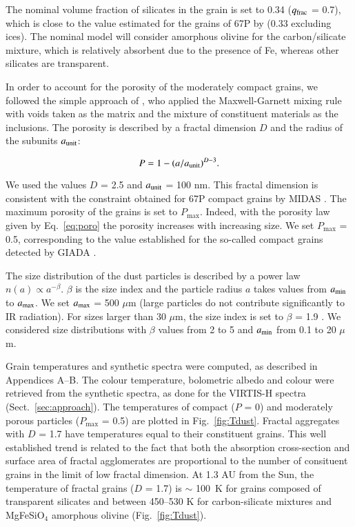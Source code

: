 \documentclass[a4paper,fleqn,usenatbib]{mnras}
\begin{document}
The nominal volume fraction of silicates in the grain is set to 0.34 ($q_{\rm frac}$ = 0.7), which is close to the value estimated for the grains of 67P by \citet{Fulle2016} (0.33 excluding ices).  The nominal model will consider amorphous olivine for the carbon/silicate mixture, which is relatively absorbent due to the presence of Fe, whereas other silicates are transparent.


In order to account for the porosity of the moderately compact grains, we followed the simple approach of \citet{Greenberg1990}, who applied the Maxwell-Garnett mixing rule with voids taken as the matrix and the mixture of constituent materials as the inclusions.  The porosity is described by a fractal dimension $D$ and the radius of the subunits $a_{\rm unit}$:

\begin{equation}\label{eq:poro}
P =1-(a/a_{\rm unit})^{D-3}.
\end{equation}

\noindent
We used the values $D$ = 2.5 and $a_{\rm unit}$ = 100 nm. This fractal dimension is consistent with the constraint obtained for 67P compact grains by MIDAS \citep{Mannel2016}. The maximum porosity of the grains is set to $P_{\max}$. Indeed, with the porosity law given by Eq.~\ref{eq:poro} the porosity increases with increasing size.  We set $P_{\max}$ = 0.5, corresponding to the value established for the so-called compact grains detected by GIADA \citep{Fulle2016}.


The size distribution of the dust particles is described by a power law  $n(a) \propto  a^{-\beta}$. $\beta$ is the size index and the particle radius $a$ takes values from $a_{\rm min}$ to $a_{\rm max}$. We set $a_{\rm max}$ = 500 $\mu$m (large particles do not contribute significantly to IR radiation). For sizes larger than 30 $\mu$m, the size index is set to $\beta$ = 1.9 \citep{Merouane2016}. We considered size distributions with $\beta$ values from 2 to 5 and $a_{\rm min}$ from 0.1 to 20 $\mu$m.

Grain temperatures and synthetic spectra were computed, as described in Appendices A--B.  The colour temperature, bolometric albedo and colour were retrieved from the synthetic spectra, as done for the VIRTIS-H spectra (Sect.~\ref{sec:approach}). The temperatures of compact ($P$ = 0) and moderately porous particles ($P_{\max}$ = 0.5) are plotted in Fig.~\ref{fig:Tdust}. Fractal aggregates with $D$ = 1.7 have temperatures equal to their constituent grains.
This well established trend \citep[][and references therein]{Kimura2016} is related to the fact that both the absorption cross-section and surface area of fractal agglomerates are proportional to the number of consituent grains in the limit of low fractal dimension. At 1.3 AU from the Sun, the temperature of fractal grains ($D$ = 1.7)
is $\sim$ 100~K for grains composed of transparent silicates and between 450--530 K for carbon-silicate mixtures and MgFeSiO$_4$ amorphous olivine (Fig.~\ref{fig:Tdust}).
\end{document}
